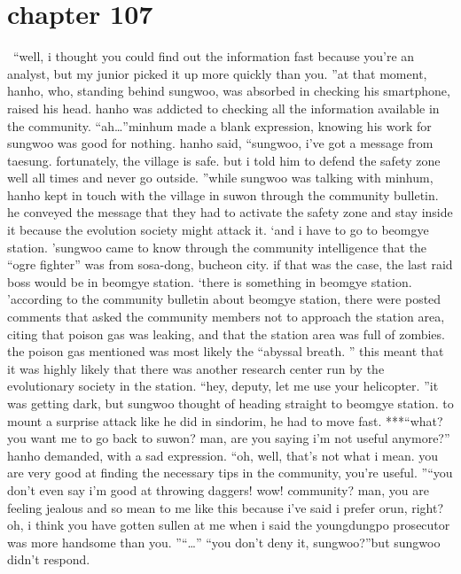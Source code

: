 \section{chapter 107}






 “well, i thought you could find out the information fast because you’re an analyst, but my junior picked it up more quickly than you.
”at that moment, hanho, who, standing behind sungwoo, was absorbed in checking his smartphone, raised his head.
 hanho was addicted to checking all the information available in the community.
“ah…”minhum made a blank expression, knowing his work for sungwoo was good for nothing.
hanho said, “sungwoo, i’ve got a message from taesung.
 fortunately, the village is safe.
 but i told him to defend the safety zone well all times and never go outside.
”while sungwoo was talking with minhum, hanho kept in touch with the village in suwon through the community bulletin.
 he conveyed the message that they had to activate the safety zone and stay inside it because the evolution society might attack it.
‘and i have to go to beomgye station.
’sungwoo came to know through the community intelligence that the “ogre fighter” was from sosa-dong, bucheon city.
 if that was the case, the last raid boss would be in beomgye station.
‘there is something in beomgye station.
’according to the community bulletin about beomgye station, there were posted comments that asked the community members not to approach the station area, citing that poison gas was leaking, and that the station area was full of zombies.
the poison gas mentioned was most likely the “abyssal breath.
” this meant that it was highly likely that there was another research center run by the evolutionary society in the station.
“hey, deputy, let me use your helicopter.
”it was getting dark, but sungwoo thought of heading straight to beomgye station.
to mount a surprise attack like he did in sindorim, he had to move fast.
***“what? you want me to go back to suwon? man, are you saying i’m not useful anymore?” hanho demanded, with a sad expression.
“oh, well, that’s not what i mean.
 you are very good at finding the necessary tips in the community, you’re useful.
”“you don’t even say i’m good at throwing daggers! wow! community? man, you are feeling jealous and so mean to me like this because i’ve said i prefer orun, right? oh, i think you have gotten sullen at me when i said the youngdungpo prosecutor was more handsome than you.
”“…”
“you don’t deny it, sungwoo?”but sungwoo didn’t respond.

